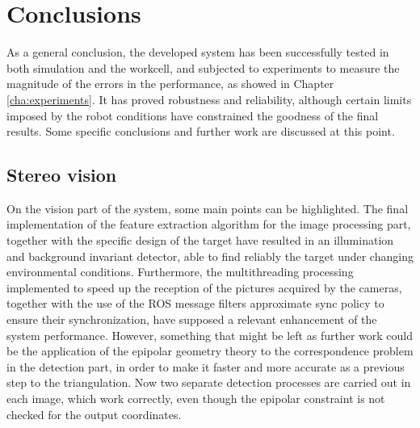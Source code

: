 
\chapter{Conclusions} %
\label{cha:conclusions}
As a general conclusion, the developed system has been successfully tested in both simulation and the workcell, and subjected to experiments to measure the magnitude of the errors in the performance, as showed in Chapter \ref{cha:experiments}.
It has proved robustness and reliability, although certain limits imposed by the robot conditions have constrained the goodness of the final results. Some specific conclusions and further work are discussed at this point.

\section{Stereo vision}
On the vision part of the system, some main points can be highlighted.
The final implementation of the feature extraction algorithm for the image processing part, together with the specific design of the target have resulted in an illumination and background invariant detector, able to find reliably the target under changing environmental conditions.
Furthermore, the multithreading processing implemented to speed up the reception of the pictures acquired by the cameras, together with the use of the ROS message filters approximate sync policy to ensure their synchronization, have supposed a relevant enhancement of the system performance.
However, something that might be left as further work could be the application of the epipolar geometry theory to the correspondence problem in the detection part, in order to make it faster and more accurate as a previous step to the triangulation. 
Now two separate detection processes are carried out in each image, which work correctly, even though the epipolar constraint is not checked for the output coordinates.



